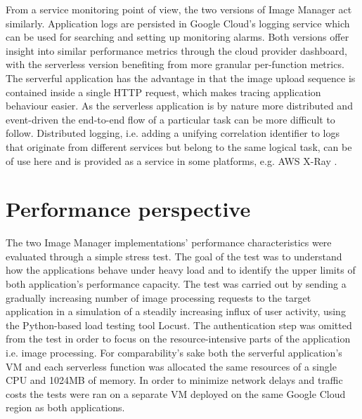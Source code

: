 From a service monitoring point of view, the two versions of Image Manager act similarly. Application logs are persisted in Google Cloud's logging service which can be used for searching and setting up monitoring alarms. Both versions offer insight into similar performance metrics through the cloud provider dashboard, with the serverless version benefiting from more granular per-function metrics. The serverful application has the advantage in that the image upload sequence is contained inside a single HTTP request, which makes tracing application behaviour easier. As the serverless application is by nature more distributed and event-driven the end-to-end flow of a particular task can be more difficult to follow. Distributed logging, i.e. adding a unifying correlation identifier to logs that originate from different services but belong to the same logical task, can be of use here and is provided as a service in some platforms, e.g. AWS X-Ray \parencite{awslambda0218}.

\section{Performance perspective}

The two Image Manager implementations' performance characteristics were evaluated through a simple stress test. The goal of the test was to understand how the applications behave under heavy load and to identify the upper limits of both application's performance capacity. The test was carried out by sending a gradually increasing number of image processing requests to the target application in a simulation of a steadily increasing influx of user activity, using the Python-based load testing tool Locust. The authentication step was omitted from the test in order to focus on the resource-intensive parts of the application i.e. image processing. For comparability's sake both the serverful application's VM and each serverless function was allocated the same resources of a single CPU and 1024MB of memory. In order to minimize network delays and traffic costs the tests were ran on a separate VM deployed on the same Google Cloud region as both applications.

